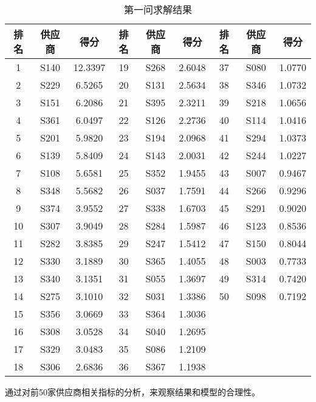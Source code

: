 \documentclass[withoutpreface,bwprint]{cumcmthesis} %
\begin{document}
\begin{table}[h]
    \caption{第一问求解结果}\label{第一问结果} \centering
    \centering
    \begin{tabular}{|c|c|c|c|c|c|c|c|c|}
    \hline
    \textbf{排名} & \textbf{供应商} & \textbf{得分} & \textbf{排名} & \textbf{供应商} & \textbf{得分} & \textbf{排名} & \textbf{供应商} & \textbf{得分}\\\hline
    1 & S140 & 12.3397 & 19 & S268 & 2.6048 & 37 & S080 & 1.0770 \\ \hline
    2 & S229 & 6.5265 & 20 & S131 & 2.5634 & 38 & S346 & 1.0732 \\ \hline
    3 & S151 & 6.2086 & 21 & S395 & 2.3211 & 39 & S218 & 1.0656 \\ \hline
    4 & S361 & 6.0497 & 22 & S126 & 2.2736 & 40 & S114 & 1.0416 \\ \hline
    5 & S201 & 5.9820 & 23 & S194 & 2.0968 & 41 & S294 & 1.0373 \\ \hline
    6 & S139 & 5.8409 & 24 & S143 & 2.0031 & 42 & S244 & 1.0227 \\ \hline
    7 & S108 & 5.6581 & 25 & S352 & 1.9455 & 43 & S007 & 0.9467 \\ \hline
    8 & S348 & 5.5682 & 26 & S037 & 1.7591 & 44 & S266 & 0.9296 \\ \hline
    9 & S374 & 3.9552 & 27 & S338 & 1.6703 & 45 & S291 & 0.9020 \\ \hline
    10 & S307 & 3.9049 & 28 & S284 & 1.5987 & 46 & S123 & 0.8536 \\ \hline
    11 & S282 & 3.8385 & 29 & S247 & 1.5412 & 47 & S150 & 0.8044 \\ \hline
    12 & S330 & 3.1889 & 30 & S365 & 1.4055 & 48 & S003 & 0.7733 \\ \hline
    13 & S340 & 3.1351 & 31 & S055 & 1.3697 & 49 & S314 & 0.7420 \\ \hline
    14 & S275 & 3.1010 & 32 & S031 & 1.3386 & 50 & S098 & 0.7192 \\ \hline
    15 & S356 & 3.0669 & 33 & S364 & 1.3036 &  &  &  \\ \hline
    16 & S308 & 3.0528 & 34 & S040 & 1.2695 &  &  &  \\ \hline
    17 & S329 & 3.0483 & 35 & S086 & 1.2109 &  &  &  \\ \hline
    18 & S306 & 2.6836 & 36 & S367 & 1.1938 &  &  &  \\ \hline
    \end{tabular}
\end{table}

通过对前50家供应商相关指标的分析，来观察结果和模型的合理性。
\end{document}
